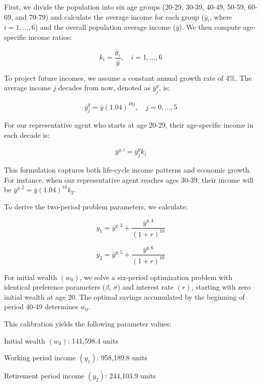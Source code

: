 \documentclass[12pt]{article}
\begin{document}
\begin{CJK*}{UTF8}{gbsn}
First, we divide the population into six age groups (20-29, 30-39, 40-49, 50-59, 60-69, and 70-79) and calculate the average income for each group ($\bar{y}_i$, where $i=1,\ldots,6$) and the overall population average income ($\bar{y}$). We then compute age-specific income ratios:

\begin{equation}
k_i = \frac{\bar{y}_i}{\bar{y}}, \quad i=1,\ldots,6
\end{equation}

To project future incomes, we assume a constant annual growth rate of 4\%. The average income $j$ decades from now, denoted as $\bar{y}^g_j$, is:

\begin{equation}
\bar{y}^g_j = \bar{y}(1.04)^{10j}, \quad j=0,\ldots,5
\end{equation}

For our representative agent who starts at age 20-29, their age-specific income in each decade is:

\begin{equation}
\bar{y}^{g,i} = \bar{y}^g_j k_i
\end{equation}

This formulation captures both life-cycle income patterns and economic growth. For instance, when our representative agent reaches ages 30-39, their income will be $\bar{y}^{g,2} = \bar{y}(1.04)^{10}k_2$.

To derive the two-period problem parameters, we calculate:

\begin{equation}
y_1 =  \bar{y}^{g,3}+\frac{\bar{y}^{g,4}}{(1+r)^{10}}
\end{equation}

\begin{equation}
y_2 =  \bar{y}^{g,5}+\frac{\bar{y}^{g,6}}{(1+r)^{10}}
\end{equation}

For initial wealth $(w_0)$, we solve a six-period optimization problem with identical preference parameters ($\beta$, $\sigma$) and interest rate $(r)$, starting with zero initial wealth at age 20. The optimal savings accumulated by the beginning of period 40-49 determines $w_0$.

This calibration yields the following parameter values:

Initial wealth $(w_0)$: 141,598.4 units

Working period income $(y_1)$: 958,189.8 units

Retirement period income $(y_2)$: 244,103.9 units


\end{CJK*}
\end{document}
